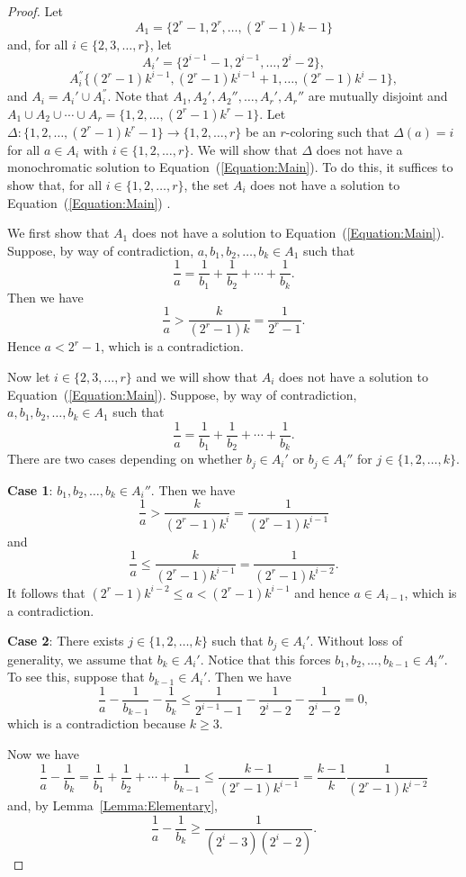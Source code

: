 \documentclass[11pt]{article}
\theoremstyle{definition}
\begin{document}
\begin{proof}
    Let 
    \[
    A_1=\{2^r-1,2^r,\ldots,(2^r-1)k-1\}
    \]
    and, for all $i\in\{2,3,\ldots,r\}$, let
    \[
    A_i'=\{2^{i-1}-1,2^{i-1},\ldots,2^i-2\},
    \]
    \[
    A_i^{''}\{(2^r-1)k^{i-1}, (2^r-1)k^{i-1}+1,\ldots,(2^r-1)k^i-1\},
    \]
    and $A_i=A_i'\cup A_i^{''}$. Note that $A_1,A_2',A_2'',\ldots,A_r',A_r''$ are mutually disjoint and $A_1\cup A_2\cup\cdots\cup A_r=\{1,2,\ldots,(2^r-1)k^r-1\}$. Let $\Delta:\{1,2,\ldots,(2^r-1)k^r-1\}\to\{1,2,\ldots,r\}$ be an $r$-coloring such that $\Delta(a)=i$ for all $a\in A_i$ with $i\in\{1,2,\ldots,r\}$. We will show that $\Delta$ does not have a monochromatic solution to Equation~(\ref{Equation:Main}). To do this, it suffices to show that, for all $i\in\{1,2,\ldots,r\}$, the set $A_i$ does not have a solution to Equation~(\ref{Equation:Main}) .

    We first show that $A_1$ does not have a solution to Equation~(\ref{Equation:Main}). Suppose, by way of contradiction, $a,b_1,b_2,\ldots,b_k\in A_1$ such that
    \[
    \frac{1}{a}=\frac{1}{b_1}+\frac{1}{b_2}+\cdots+\frac{1}{b_k}.
    \]
    Then we have
    \[
    \frac{1}{a}>\frac{k}{(2^r-1)k}=\frac{1}{2^r-1}.
    \]
    Hence $a<2^r-1$, which is a contradiction.

    Now let $i\in\{2,3,\ldots,r\}$ and we will show that $A_i$ does not have a solution to Equation~(\ref{Equation:Main}). Suppose, by way of contradiction, $a,b_1,b_2,\ldots,b_k\in A_1$ such that
    \[
    \frac{1}{a}=\frac{1}{b_1}+\frac{1}{b_2}+\cdots+\frac{1}{b_k}.
    \]
    There are two cases depending on whether $b_j\in A_i'$ or $b_j\in A_i''$ for $j\in\{1,2,\ldots,k\}$.

   {\bf Case 1}: $b_1,b_2,\ldots,b_k\in A_i''$. Then we have
    \[
    \frac{1}{a}>\frac{k}{(2^r-1)k^i}=\frac{1}{(2^r-1)k^{i-1}}
    \]
    and
    \[
    \frac{1}{a}\leq\frac{k}{(2^r-1)k^{i-1}}=\frac{1}{(2^r-1)k^{i-2}}.
    \]
    It follows that $(2^r-1)k^{i-2}\leq a<(2^r-1)k^{i-1}$ and hence $a\in A_{i-1}$, which is a contradiction.

    {\bf Case 2}: There exists $j\in\{1,2,\ldots,k\}$ such that $b_j\in A_i'$. Without loss of generality, we assume that $b_k\in A_i'$. Notice that this forces $b_1,b_2,\ldots,b_{k-1}\in A_i''$. To see this, suppose that $b_{k-1}\in A_i'$. Then we have
    \[
    \frac{1}{a}-\frac{1}{b_{k-1}}-\frac{1}{b_k}\leq\frac{1}{2^{i-1}-1}-\frac{1}{2^i-2}-\frac{1}{2^i-2}=0,
    \]
    which is a contradiction because $k\geq3$.

    Now we have
    \[
    \frac{1}{a}-\frac{1}{b_k}=\frac{1}{b_1}+\frac{1}{b_2}+\cdots+\frac{1}{b_{k-1}}\leq\frac{k-1}{(2^r-1)k^{i-1}}=\frac{k-1}{k}\frac{1}{(2^r-1)k^{i-2}}
    \]
    and, by Lemma~\ref{Lemma:Elementary}, 
    \[
    \frac{1}{a}-\frac{1}{b_k}\geq\frac{1}{(2^i-3)(2^i-2)}.
    \]


\end{proof}
\end{document}

